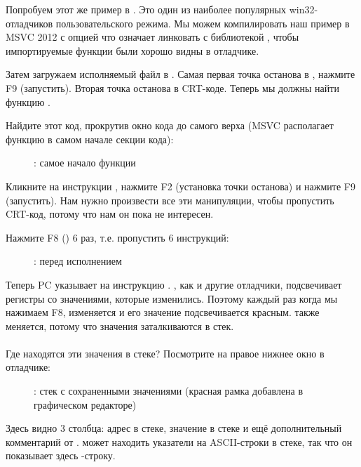 \clearpage
{}
\myindex{\olly}

Попробуем этот же пример в \olly.
Это один из наиболее популярных win32-отладчиков пользовательского режима.
Мы можем компилировать наш пример в MSVC 2012 
с опцией  что означает линковать с библиотекой ,
чтобы импортируемые функции были хорошо видны в отладчике.

Затем загружаем исполняемый файл в \olly.
Самая первая точка останова в , нажмите F9 (запустить).
Вторая точка останова в \ac{CRT}-коде.
Теперь мы должны найти функцию \main.

Найдите этот код, прокрутив окно кода до самого верха (MSVC располагает функцию \main в самом начале секции кода): 

\begin{figure}[H]
\centering
{}
\caption{\olly: самое начало функции \main}
\label{fig:printf3_olly_1}
\end{figure}

Кликните на инструкции , нажмите F2 (установка точки останова) и нажмите F9 (запустить).
Нам нужно произвести все эти манипуляции, чтобы пропустить \ac{CRT}-код, потому что нам он пока
не интересен.

\clearpage
Нажмите F8 (\stepover) 6 раз, т.е. пропустить 6 инструкций:

\begin{figure}[H]
\centering
{}
\caption{\olly: перед исполнением \printf}
\label{fig:printf3_olly_2}
\end{figure}

Теперь \ac{PC} указывает на инструкцию .
\olly, как и другие отладчики, подсвечивает регистры со значениями, которые изменились.
Поэтому каждый раз когда мы нажимаем F8, \EIP изменяется и его значение подсвечивается красным.
\ESP также меняется, потому что значения заталкиваются в стек.\\
\\
Где находятся эти значения в стеке?
Посмотрите на правое нижнее окно в отладчике:

\begin{figure}[H]
\centering

\caption{\olly: стек с сохраненными значениями (красная рамка добавлена в графическом редакторе)}
\end{figure}

Здесь видно 3 столбца: адрес в стеке, значение в стеке и ещё дополнительный комментарий
от \olly. 
\olly может находить указатели на ASCII-строки в стеке, так что он показывает здесь \printf{}-строку.


